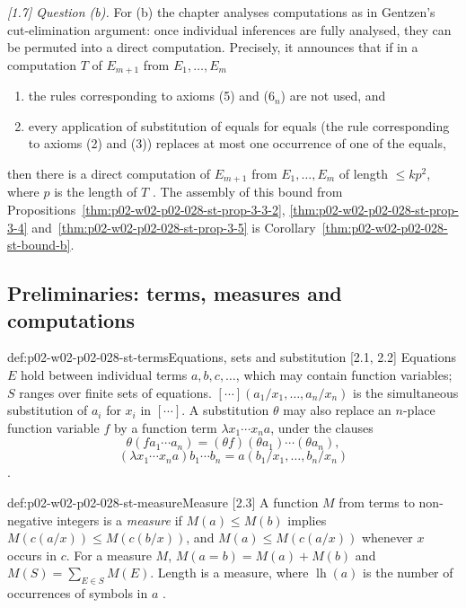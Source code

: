 \emph{[1.7] Question (b).}  For (b) the chapter analyses computations as in
Gentzen's cut-elimination argument: once individual inferences are fully
analysed, they can be permuted into a direct computation.  Precisely, it
announces that if in a computation \(T\) of \(E_{m+1}\) from
\(E_1,\ldots,E_m\)
\begin{enumerate}
  \item[(i)] the rules corresponding to axioms (5) and (\(6_n\)) are not
        used, and
  \item[(ii)] every application of substitution of equals for equals (the
        rule corresponding to axioms (2) and (3)) replaces at most one
        occurrence of one of the equals,
\end{enumerate}
then there is a direct computation of \(E_{m+1}\) from \(E_1,\ldots,E_m\) of
length \(\leq kp^2\), where \(p\) is the length of \(T\)
\cite[\S1.7, p.~901]{Statman1977}.  The assembly of this bound from
Propositions~\ref{thm:p02-w02-p02-028-st-prop-3-3-2},
\ref{thm:p02-w02-p02-028-st-prop-3-4} and~\ref{thm:p02-w02-p02-028-st-prop-3-5}
is Corollary~\ref{thm:p02-w02-p02-028-st-bound-b}.

\subsection{Preliminaries: terms, measures and computations}
\label{sec:p02-w02-p02-028-st-preliminaries}

\begin{hbdefinition}{def:p02-w02-p02-028-st-terms}{Equations, sets and substitution [2.1, 2.2]}
Equations \(E\) hold between individual terms \(a,b,c,\ldots\), which may
contain function variables; \(S\) ranges over finite sets of equations.
\([\cdots](a_1/x_1,\ldots,a_n/x_n)\) is the simultaneous substitution of
\(a_i\) for \(x_i\) in \([\cdots]\).  A substitution \(\theta\) may also
replace an \(n\)-place function variable \(f\) by a function term
\(\lambda x_1\cdots x_n a\), under the clauses
\[
 \theta(fa_1\cdots a_n)=(\theta f)(\theta a_1)\cdots(\theta a_n),
\]
\[
 (\lambda x_1\cdots x_na)b_1\cdots b_n=a(b_1/x_1,\ldots,b_n/x_n)
\]
\cite[\S\S2.1--2.2, p.~901]{Statman1977}.
\end{hbdefinition}

\begin{hbdefinition}{def:p02-w02-p02-028-st-measure}{Measure [2.3]}
A function \(M\) from terms to non-negative integers is a \emph{measure} if
\(M(a)\leq M(b)\) implies \(M(c(a/x))\leq M(c(b/x))\), and
\(M(a)\leq M(c(a/x))\) whenever \(x\) occurs in \(c\).  For a measure \(M\),
\(M(a=b)=M(a)+M(b)\) and \(M(S)=\sum_{E\in S}M(E)\).  Length is a measure,
where \(\operatorname{lh}(a)\) is the number of occurrences of symbols in
\(a\) \cite[\S2.3, p.~901]{Statman1977}.
\end{hbdefinition}

